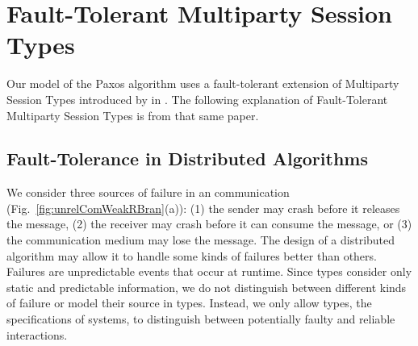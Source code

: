\section{Fault-Tolerant Multiparty Session Types}
Our model of the Paxos algorithm uses a fault-tolerant extension of Multiparty Session Types introduced by \citeauthor{PetersEtal21} in \cite{PetersEtal21}.
The following explanation of Fault-Tolerant Multiparty Session Types is from that same paper.

\subsection{Fault-Tolerance in Distributed Algorithms}
\label{sec:faultTol}
We consider three sources of failure in an \unrel communication (Fig.~\ref{fig:unrelComWeakRBran}(a)):
(1) the sender may crash before it releases the message,
(2) the receiver may crash before it can consume the message, or
(3) the communication medium may lose the message.
The design of a distributed algorithm may allow it to handle some kinds of failures better than others.
Failures are unpredictable events that occur at runtime.
Since types consider only static and predictable information, we do not distinguish between different kinds of failure or model their source in types.
Instead, we only allow types, \ie the specifications of systems, to distinguish between potentially faulty and reliable interactions.

